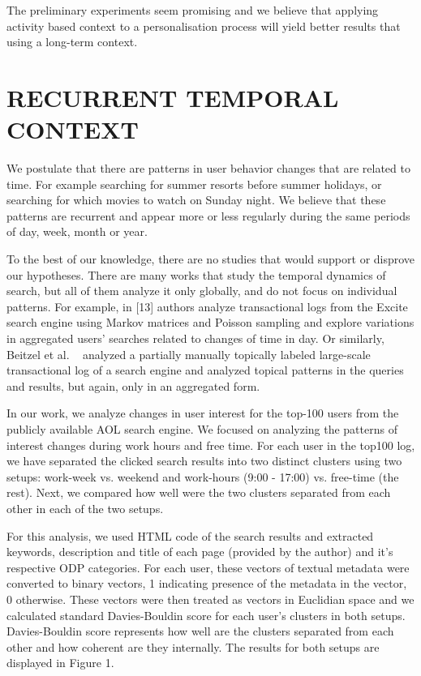 \documentclass{sig-alternate} %
\begin{document}
{The preliminary experiments seem promising and we believe 
that applying activity based context to a personalisation process 
will yield better results that using a long-term
context.


\section{RECURRENT TEMPORAL CONTEXT}
We postulate that there are patterns in user behavior
changes that are related to time. For example searching
for summer resorts before summer holidays, or searching for
which movies to watch on Sunday night. We believe that
these patterns are recurrent and appear more or less 
regularly during the same periods of day, week, month or year.


To the best of our knowledge, there are no studies that
would support or disprove our hypotheses. There are many
works that study the temporal dynamics of search, but all of
them analyze it only globally, and do not focus on individual
patterns. For example, in [13] authors analyze transactional
logs from the Excite search engine using Markov matrices
and Poisson sampling and explore variations in aggregated
users' searches related to changes of time in day. Or similarly, 
Beitzel et al. ~\cite{beitzel} analyzed a partially manually topically 
labeled large-scale transactional log of a search engine
and analyzed topical patterns in the queries and results, but
again, only in an aggregated form.


In our work, we analyze changes in user interest for the
top-100 users from the publicly available AOL search engine.
We focused on analyzing the patterns of interest changes
during work hours and free time. For each user in the top100 
log, we have separated the clicked search results into two
distinct clusters using two setups: work-week vs. weekend
and work-hours (9:00 - 17:00) vs. free-time (the rest). Next,
we compared how well were the two clusters separated from
each other in each of the two setups.


For this analysis, we used HTML code of the search results 
and extracted keywords, description and title of each
page (provided by the author) and it's respective ODP 
categories. For each user, these vectors of textual metadata
were converted to binary vectors, 1 indicating presence of
the metadata in the vector, 0 otherwise. These vectors were
then treated as vectors in Euclidian space and we calculated 
standard Davies-Bouldin score for each user's clusters
in both setups. Davies-Bouldin score represents how well
are the clusters separated from each other and how coherent
are they internally. The results for both setups are displayed
in Figure 1.

}
\end{document}
